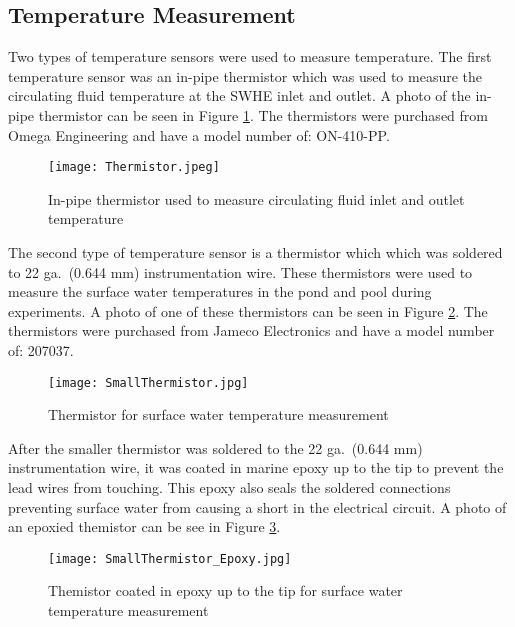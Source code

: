 	\subsection{Temperature Measurement}
	\label{subsec:ExpMethod:Instr:Temp}

Two types of temperature sensors were used to measure temperature. The first temperature sensor was an in-pipe thermistor which was used to measure the circulating fluid temperature at the SWHE inlet and outlet. A photo of the in-pipe thermistor can be seen in Figure \ref{fig:ExpMethod:Instr:Temp:Thermistor}. The thermistors were purchased from Omega Engineering and have a model number of: ON-410-PP.

\begin{figure}
	\centering
	\texttt{[image: Thermistor.jpeg]}
	\caption[In-pipe thermistor]{In-pipe thermistor used to measure circulating fluid inlet and outlet temperature}
	\label{fig:ExpMethod:Instr:Temp:Thermistor}
\end{figure}

The second type of temperature sensor is a thermistor which which was soldered to 22 ga.\ (0.644 mm) instrumentation wire. These thermistors were used to measure the surface water temperatures in the pond and pool during experiments. A photo of one of these thermistors can be seen in Figure \ref{fig:ExpMethod:Instr:Temp:SmallThermistor}. The thermistors were purchased from Jameco Electronics and have a model number of: 207037.

\begin{figure}
	\centering
	\texttt{[image: SmallThermistor.jpg]}
	\caption[Small thermistor]{Thermistor for surface water temperature measurement}
	\label{fig:ExpMethod:Instr:Temp:SmallThermistor}
\end{figure}

After the smaller thermistor was soldered to the 22 ga.\ (0.644 mm) instrumentation wire, it was coated in marine epoxy up to the tip to prevent the lead wires from touching. This epoxy also seals the soldered connections preventing surface water from causing a short in the electrical circuit. A photo of an epoxied themistor can be see in Figure \ref{fig:ExpMethod:Instr:Temp:SmallThemistor:Epoxy}.

\begin{figure}
	\centering
	\texttt{[image: SmallThermistor\_Epoxy.jpg]}
	\caption[Epoxy coated thermistor]{Themistor coated in epoxy up to the tip for surface water temperature measurement}
	\label{fig:ExpMethod:Instr:Temp:SmallThemistor:Epoxy}
\end{figure}

